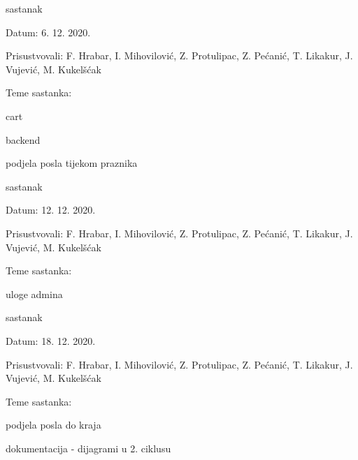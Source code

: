 \begin{packed_enum}
\begin{packed_item}
\begin{packed_item}
				\end{packed_item}
			\end{packed_item}
		
			\item  sastanak
			\item[] \begin{packed_item}
				\item Datum: 6. 12. 2020.
				\item Prisustvovali: F. Hrabar, I. Mihovilović, Z. Protulipac, Z. Pećanić, T. Likakur, J. Vujević, M. Kukelšćak
				\item Teme sastanka:
				\begin{packed_item}
					\item  cart
					\item  backend
					\item  podjela posla tijekom praznika
					
					
				\end{packed_item}
			\end{packed_item}
			\item  sastanak
			\item[] \begin{packed_item}
				\item Datum: 12. 12. 2020.
				\item Prisustvovali: F. Hrabar, I. Mihovilović, Z. Protulipac, Z. Pećanić, T. Likakur, J. Vujević, M. Kukelšćak
				\item Teme sastanka:
				\begin{packed_item}
					\item  uloge admina
				
					
				\end{packed_item}
			\end{packed_item}
		
			\item  sastanak
			\item[] \begin{packed_item}
				\item Datum: 18. 12. 2020.
				\item Prisustvovali: F. Hrabar, I. Mihovilović, Z. Protulipac, Z. Pećanić, T. Likakur, J. Vujević, M. Kukelšćak
				\item Teme sastanka:
				\begin{packed_item}
					\item  podjela posla do kraja
					\item dokumentacija - dijagrami u 2. ciklusu
				

\end{packed_item}
\end{packed_item}
\end{packed_enum}
